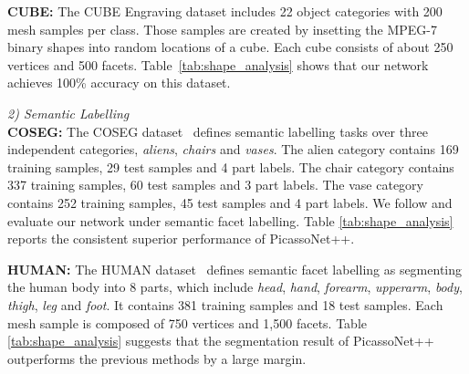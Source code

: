 \vspace{1mm}
\noindent\textbf{CUBE:} The CUBE
Engraving dataset \cite{hanocka2019meshcnn} includes 22 object categories with 200 mesh samples per class. Those samples are created by insetting the MPEG-7 binary
shapes \cite{latecki2000shape} into random locations of a cube. 
Each cube consists of about 250 vertices and 500 facets. Table~\ref{tab:shape_analysis} shows that our network achieves 100\% accuracy on this dataset.

\vspace{1mm}
\noindent\textit{2) Semantic Labelling}
\vspace{1mm}\\
\vspace{1mm}
\noindent\textbf{COSEG:} The COSEG dataset~\cite{wang2012active} defines semantic labelling tasks over three independent categories, \ie \textit{aliens}, \textit{chairs} and \textit{vases}.
The alien category contains 169 training samples, 29 test samples and 4 part labels. The chair category contains 337 training samples, 60 test samples and 3 part labels. The vase category contains 252 training samples, 45 test samples and 4 part labels. 
We follow \cite{milano2020primal} and evaluate our network under semantic facet labelling. 
Table \ref{tab:shape_analysis} reports the consistent superior performance of PicassoNet++.

\vspace{1mm}
\noindent\textbf{HUMAN:}
The HUMAN dataset~\cite{maron2017convolutional} defines semantic facet labelling as segmenting the human body into 8 parts, which include  \textit{head}, \textit{hand}, \textit{forearm}, \textit{upperarm}, \textit{body}, \textit{thigh}, \textit{leg} and \textit{foot}. 
It contains 381 training samples and 18 test samples. Each mesh sample is composed of 750 vertices and 1,500 facets. Table \ref{tab:shape_analysis} suggests that the segmentation result of PicassoNet++ outperforms the previous methods by a large margin. 

